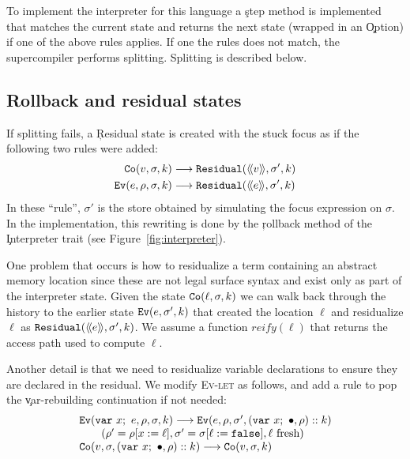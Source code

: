To implement the interpreter for this language 
a \c{step} method is implemented that matches the current state
and returns the next state (wrapped in an \c{Option}) if one of the above
rules applies.
If one the rules does not match, the supercompiler performs splitting.
Splitting is described below.

\subsection{Rollback and residual states}

If splitting fails, a \c{Residual} state is created with the stuck focus
as if the following two rules were added:
\begin{align*}
     \c{Co}(v, \sigma, k)
        & \longrightarrow
        \c{Residual}(\R{v}, \sigma', k) \\ 
     \c{Ev}(e, \rho, \sigma, k)
        & \longrightarrow
        \c{Residual}(\R{e}, \sigma', k) \\
\end{align*}
In these ``rule'', $\sigma'$ is the store obtained by simulating the focus
expression on $\sigma$.
In the implementation, this rewriting is done
by the \c{rollback} method of the \c{Interpreter} trait (see Figure~\ref{fig:interpreter}).

One problem that occurs is how to residualize a term
containing an abstract memory location since these are not legal surface
syntax and exist only as part of the interpreter state.
Given the state $\c{Co}(\ell, \sigma, k)$ we can walk back through
the history to the earlier state $\c{Ev}(e, \sigma', k)$ that created the location $\ell$
and residualize $\ell$ as $\c{Residual}(\R{e}, \sigma', k)$.
We assume a function $\mathit{reify}(\ell)$ that returns the access path used
to compute $\ell$.

Another detail is that we need to residualize variable declarations to ensure
they are declared in the residual. We modify \textsc{Ev-let} as follows, and
add a rule to pop the \c{var}-rebuilding continuation if not needed:
\[
  \begin{array}{l} \c{Ev}(\c{var}~x;~e, \rho, \sigma, k)
     \longrightarrow
    \c{Ev}(e, \rho, \sigma', (\c{var}~x;~\bullet, \rho)::k)
        \\ \qquad  (\rho' = \rho[x := \ell], \sigma' = \sigma[\ell := \c{false}], \ell~\mbox{fresh})
      \\
    \c{Co}(v, \sigma, (\c{var}~x;~\bullet, \rho)::k)
     \longrightarrow
    \c{Co}(v, \sigma, k) \\
  \end{array}
\]

